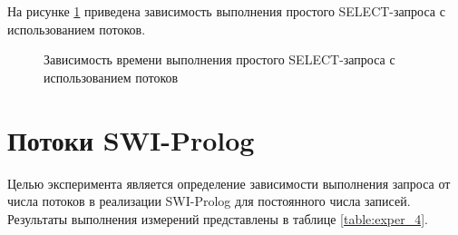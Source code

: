 На рисунке \ref{image:diagram_3} приведена зависимость выполнения простого SELECT-запроса с использованием потоков.
\begin{figure}[H]
	\centering
	\captionsetup{justification=centering}
	\caption{Зависимость времени выполнения простого SELECT-запроса с использованием потоков} 
	\label{image:diagram_3}
\end{figure} 

\section{Потоки SWI-Prolog}
\vspace{-0.5cm}
Целью эксперимента является определение зависимости выполнения запроса от числа потоков в реализации SWI-Prolog для постоянного числа записей. Результаты выполнения измерений представлены в таблице \ref{table:exper_4}. \vspace{0.5cm}

